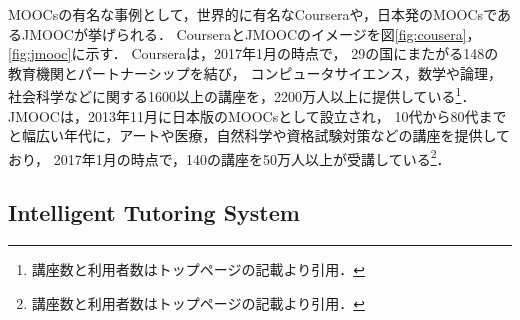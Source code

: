 \begin{figure}[htb]
\begin{center}
\hspace*{-40pt}
\end{center}
\end{figure}

MOOCsの有名な事例として，世界的に有名なCourseraや，日本発のMOOCsであるJMOOCが挙げられる．
CourseraとJMOOCのイメージを図\ref{fig:cousera}，\ref{fig:jmooc}に示す．
Courseraは，2017年1月の時点で，
29の国にまたがる148の教育機関とパートナーシップを結び，
コンピュータサイエンス，数学や論理，社会科学などに関する1600以上の講座を，2200万人以上に提供している\footnote{講座数と利用者数はトップページの記載より引用．}．
JMOOCは，2013年11月に日本版のMOOCsとして設立され，
10代から80代までと幅広い年代に，アートや医療，自然科学や資格試験対策などの講座を提供しており，
2017年1月の時点で，140の講座を50万人以上が受講している\footnote{講座数と利用者数はトップページの記載より引用．}．



\subsection{Intelligent Tutoring System}

